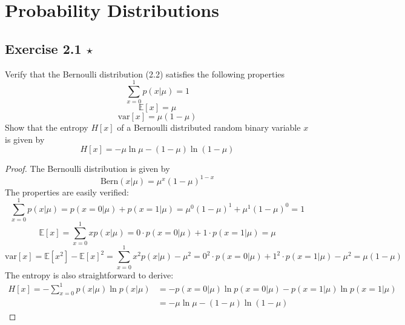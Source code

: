 \chapter{Probability Distributions}

\section*{Exercise 2.1 $\star$}
Verify that the Bernoulli distribution (2.2) satisfies
the following properties
\begin{equation}\label{eq:2.257}\tag{2.257}
    \sum_{x=0}^{1} p(x | \mu) = 1
\end{equation}
\vspace{-1em}
\begin{equation}\label{eq:2.258}\tag{2.258}
    \mathbb{E}[x] = \mu
\end{equation}
\vspace{-1em}
\begin{equation}\label{eq:2.259}\tag{2.259}
    \text{var}[x] = \mu(1 - \mu)
\end{equation}
Show that the entropy $H[x]$ of a Bernoulli distributed
random binary variable $x$ is given by
\begin{equation}\label{eq:2.260}\tag{2.260}
    H[x] = -\mu \ln \mu - (1 - \mu) \ln(1 - \mu)
\end{equation}

\vspace{1em}

\begin{proof}
    The Bernoulli distribution is given by
    \begin{equation}\label{eq:2.2}\tag{2.2}
        \text{Bern}(x | \mu) = \mu^x (1 - \mu)^{1-x}
    \end{equation}
    The properties are easily verified:
    \[
        \sum_{x=0}^{1} p(x | \mu) = p(x = 0 | \mu) + p(x = 1 | \mu)
        = \mu^0(1 - \mu)^1 + \mu^1(1 - \mu)^0 = 1 \tag{2.257}
    \] 
    \[
        \mathbb{E}[x] = \sum_{x=0}^{1} xp(x | \mu)
        = 0 \cdot p(x = 0 | \mu) + 1 \cdot p(x = 1 | \mu)
        = \mu \tag{2.258}
    \] 
    \[
        \text{var}[x] = \mathbb{E}[x^2] - \mathbb{E}[x]^2
        = \sum_{x=0}^{1} x^2 p(x|\mu) - \mu^2
        = 0^2 \cdot p(x = 0 | \mu) + 1^2 \cdot p(x = 1 | \mu) - \mu^2
        = \mu(1 - \mu) \tag{2.259}
    \] 
    The entropy is also straightforward to derive: 
    \begin{align*}
        H[x] = -\sum_{x=0}^{1} p(x | \mu) \ln p(x | \mu)
        &= -p(x = 0 | \mu)\ln p(x = 0 | \mu) - p(x = 1 | \mu) \ln p(x = 1 | \mu) \\
        &= -\mu \ln \mu - (1 - \mu) \ln(1 - \mu)
    \end{align*}
\end{proof}

